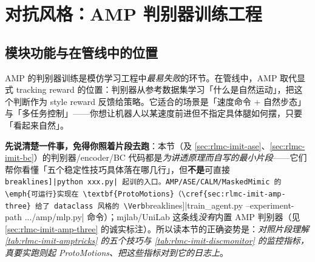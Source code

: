 \begin{practice}[练习·显式跟踪]
\end{practice}

\section{对抗风格：AMP 判别器训练工程}
\label{sec:rlmc-imit-amp}

\subsection{模块功能与在管线中的位置}
\label{sec:rlmc-imit-amp-pos}

AMP 的判别器训练是模仿学习工程中\emph{最易失败}的环节。在管线中，AMP 取代显式 tracking reward 的位置：判别器从参考数据集学习「什么是自然运动」，把这个判断作为 style reward 反馈给策略。它适合的场景是「速度命令 + 自然步态」与「多任务控制」——你想让机器人以某速度前进但不指定具体腿如何摆，只要「看起来自然」。

\begin{note}
\textbf{先说清楚一件事，免得你照着片段去跑}：本节（及 \cref{sec:rlmc-imit-ase}、\cref{sec:rlmc-imit-bc}）的判别器/encoder/BC 代码都是\emph{为讲透原理而自写的最小片段}——它们帮你看懂「五个稳定性技巧具体落在哪几行」，但\textbf{不是}可直接 \Verb[breaklines]|python xxx.py| 起训的入口。AMP/ASE/CALM/MaskedMimic 的\emph{可运行}实现在 \textbf{ProtoMotions}（\cref{sec:rlmc-imit-amp-three} 给了 dataclass 风格的 \Verb[breaklines]|train_agent.py --experiment-path .../amp/mlp.py| 命令）；mjlab/UniLab 这条线\emph{没有}内置 AMP 判别器（见 \cref{sec:rlmc-imit-amp-three} 的诚实标注）。所以读本节的正确姿势是：\emph{对照片段理解 \cref{tab:rlmc-imit-amptricks} 的五个技巧与 \cref{tab:rlmc-imit-discmonitor} 的监控指标，真要实跑则起 ProtoMotions、把这些指标对到它的日志上}。
\end{note}

